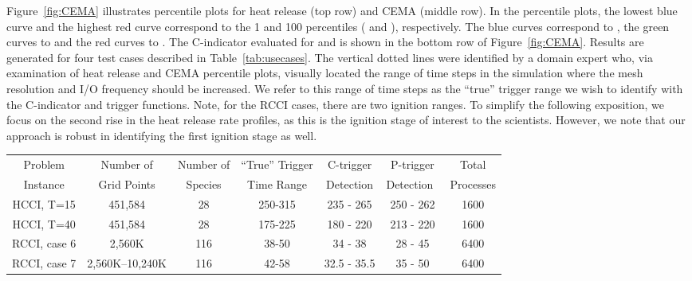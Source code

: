 \documentclass{sig-alternate}
\newcommand{\cmetric}{C}
\newcommand{\pmetric}{P}
\begin{document}
Figure~\ref{fig:CEMA} illustrates percentile plots for heat release (top row) and
CEMA
(middle row).  In the percentile plots, the lowest
blue curve and the highest red curve correspond to the 1 and
100 percentiles ( and ), respectively. The blue curves
correspond to , the green curves to 
and the red curves to . 
The \cmetric-indicator evaluated for  and
  is shown in the bottom row of Figure~\ref{fig:CEMA}. 
Results are generated for four test cases described in Table~\ref{tab:usecases}.
The vertical dotted lines were identified  by a domain expert who, via examination
of heat release and CEMA percentile plots, visually
located the range of time steps in the simulation where the mesh resolution and I/O
frequency should  be increased. We refer to this range of time steps  
as the ``true'' trigger range we wish to identify with the 
\cmetric-indicator and trigger functions. Note, for the RCCI cases, there are
two ignition ranges.
To simplify the following exposition, we focus on the second rise in the heat release rate
profiles, as this is the ignition stage of interest to the scientists. However,
we note that our approach is robust in identifying the first ignition stage as
well.

\begin{table*}[tb]
{\small
  \caption{\label{tab:usecases} Four Combustion Use Cases analyzed in this
study. The ``true'' trigger time ranges are estimated based on 
percentiles of the heat release rate. The computed time ranges were evaluated
using our quantile sampling approach.  The \cmetric-trigger and \pmetric-trigger were
computed over 50 realizations of experiments with 20 samples per process.
}
\begin{center}
\begin{tabular}{|c|c|c|c|c|c|c|} 
 \hline
 Problem & Number of & Number of & ``True'' Trigger  & \cmetric-trigger &
 \pmetric -trigger  & Total \\
 Instance & Grid Points & Species & Time Range & Detection &
 Detection~\cite{cema-insitu}  & Processes \\ \hline\hline
 HCCI, T=15   & 451,584     & 28  & 250-315 & 235 - 265  & 250 - 262 & 1600 \\
 \hline
 HCCI, T=40   & 451,584     & 28  & 175-225 & 180 - 220  & 213 - 220 & 1600 \\
 \hline
 RCCI, case 6 & 2,560K   & 116 & 38-50   & 34 - 38 & 28 - 45 &  6400 \\
 \hline
 RCCI, case 7 & 2,560K--10,240K   & 116 & 42-58   & 32.5 - 35.5 & 35 - 50 & 6400 \\
 \hline
 \end{tabular}
 \end{center}
 } 
 \end{table*}
\end{document}
